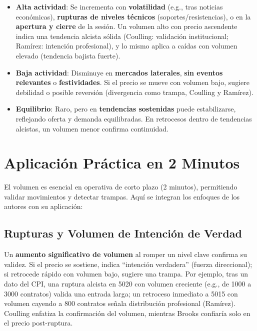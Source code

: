 \begin{itemize}
    \item \textbf{Alta actividad}: Se incrementa con \textbf{volatilidad} (e.g., tras noticias econ\'omicas), \textbf{rupturas de niveles t\'ecnicos} (soportes/resistencias), o en la \textbf{apertura y cierre} de la sesi\'on. Un volumen alto con precio ascendente indica una tendencia alcista s\'olida (Coulling: validaci\'on institucional; Ram\'irez: intenci\'on profesional), y lo mismo aplica a ca\'idas con volumen elevado (tendencia bajista fuerte).
    \item \textbf{Baja actividad}: Disminuye en \textbf{mercados laterales}, \textbf{sin eventos relevantes} o \textbf{festividades}. Si el precio se mueve con volumen bajo, sugiere debilidad o posible reversi\'on (divergencia como trampa, Coulling y Ram\'irez).
    \item \textbf{Equilibrio}: Raro, pero en \textbf{tendencias sostenidas} puede estabilizarse, reflejando oferta y demanda equilibradas. En retrocesos dentro de tendencias alcistas, un volumen menor confirma continuidad.
\end{itemize}

\section{Aplicaci\'on Pr\'actica en 2 Minutos}

El volumen es esencial en operativa de corto plazo (2 minutos), permitiendo validar movimientos y detectar trampas. Aqu\'i se integran los enfoques de los autores con su aplicaci\'on:

\subsection{Rupturas y Volumen de Intenci\'on de Verdad}
Un \textbf{aumento significativo de volumen} al romper un nivel clave confirma su validez. Si el precio se sostiene, indica ``intenci\'on verdadera'' (fuerza direccional); si retrocede r\'apido con volumen bajo, sugiere una trampa. Por ejemplo, tras un dato del CPI, una ruptura alcista en 5020 con volumen creciente (e.g., de 1000 a 3000 contratos) valida una entrada larga; un retroceso inmediato a 5015 con volumen cayendo a 800 contratos se\~nala distribuci\'on profesional (Ram\'irez). Coulling enfatiza la confirmaci\'on del volumen, mientras Brooks confiar\'ia solo en el precio post-ruptura.

